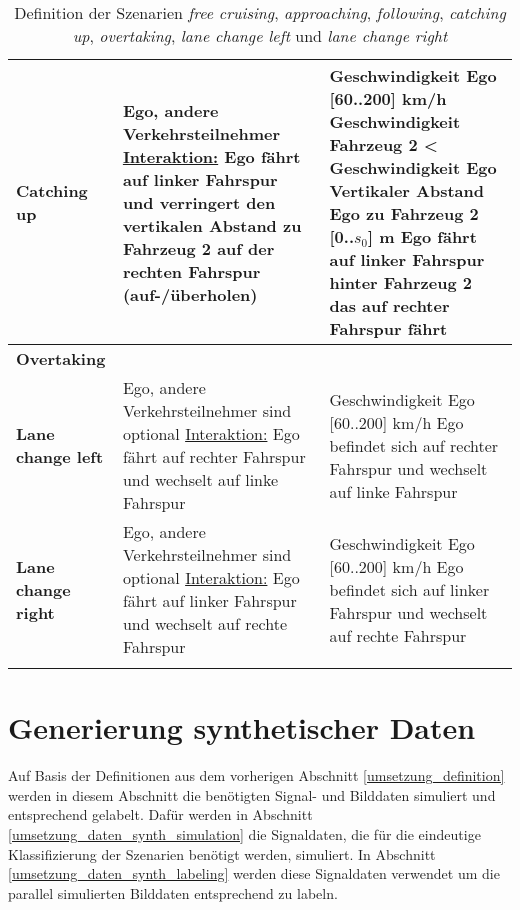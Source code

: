 \begin{longtable}[c]{p{2cm} p{5.5cm} p{6cm}}
\textbf{Catching up} & Ego, andere Verkehrsteilnehmer \newline \underline{Interaktion:} Ego fährt auf linker Fahrspur und verringert den vertikalen Abstand zu Fahrzeug 2 auf der rechten Fahrspur (auf-/überholen) & Geschwindigkeit Ego [60..200] km/h \newline Geschwindigkeit Fahrzeug 2 < Geschwindigkeit Ego \newline Vertikaler Abstand Ego zu Fahrzeug 2 [0..$s_0$] m \newline Ego fährt auf linker Fahrspur hinter Fahrzeug 2 das auf rechter Fahrspur fährt \\
\hline

\textbf{Overtaking} & & \\
\hline

\textbf{Lane change left} & Ego, andere Verkehrsteilnehmer sind optional \newline \underline{Interaktion:} Ego fährt auf rechter Fahrspur und wechselt auf linke Fahrspur & Geschwindigkeit Ego [60..200] km/h \newline Ego befindet sich auf rechter Fahrspur und wechselt auf linke Fahrspur \\
\hline

\textbf{Lane change right} & Ego, andere Verkehrsteilnehmer sind optional \newline \underline{Interaktion:} Ego fährt auf linker Fahrspur und wechselt auf rechte Fahrspur & Geschwindigkeit Ego [60..200] km/h \newline Ego befindet sich auf linker Fahrspur und wechselt auf rechte Fahrspur \\
\hline

\caption{Definition der Szenarien \textit{free cruising}, \textit{approaching}, \textit{following}, \textit{catching up}, \textit{overtaking}, \textit{lane change left} und \textit{lane change right}}
\label{tab_definition_szenarios}
\end{longtable}
\normalsize

\section{Generierung synthetischer Daten}
\label{umsetzung_daten_synth}

Auf Basis der Definitionen aus dem vorherigen Abschnitt \ref{umsetzung_definition} werden in diesem Abschnitt die benötigten Signal- und Bilddaten simuliert und entsprechend gelabelt. Dafür werden in Abschnitt \ref{umsetzung_daten_synth_simulation} die Signaldaten, die für die eindeutige Klassifizierung der Szenarien benötigt werden, simuliert. In Abschnitt \ref{umsetzung_daten_synth_labeling} werden diese Signaldaten verwendet um die parallel simulierten Bilddaten entsprechend zu labeln.
 
